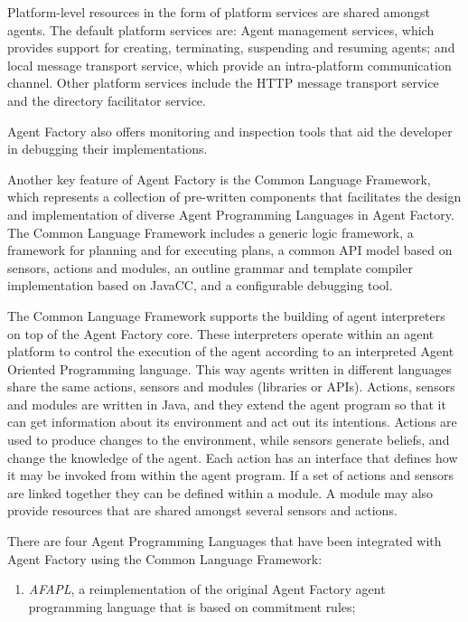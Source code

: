 \documentclass[a4paper,12pt,oneside,fleqn]{book} %
\begin{document}
{Platform-level resources in the form of platform services are shared
amongst agents. The default platform services are: Agent management
services, which provides support for creating, terminating, suspending and
resuming agents; and local message transport service, which provide an
intra-platform communication channel. Other platform services include the
HTTP message transport service and the directory facilitator service.

Agent Factory also offers monitoring and inspection tools that aid the
developer in debugging their implementations.

Another key feature of Agent Factory is the Common Language Framework,
which represents a collection of pre-written components that facilitates
the design and implementation of diverse Agent Programming Languages in
Agent Factory\null. The Common Language Framework includes a generic logic
framework, a framework for planning and for executing plans, a common API
model based on sensors, actions and modules, an outline grammar and
template compiler implementation based on JavaCC, and a configurable
debugging tool.

The Common Language Framework supports the building of agent interpreters
on top of the Agent Factory core. These interpreters operate within an
agent platform to control the execution of the agent according to an
interpreted Agent Oriented Programming language. This way agents written in
different languages share the same actions, sensors and modules (libraries
or APIs). Actions, sensors and modules are written in Java, and they extend
the agent program so that it can get information about its environment and
act out its intentions. Actions are used to produce changes to the
environment, while sensors generate beliefs, and change the knowledge of
the agent. Each action has an interface that defines how it may be invoked
from within the agent program. If a set of actions and sensors are linked
together they can be defined within a module. A module may also provide
resources that are shared amongst several sensors and actions.

There are four Agent Programming Languages that have been integrated with
Agent Factory using the Common Language Framework: \begin{enumerate}

\item \textit{AFAPL}, a reimplementation of the original Agent Factory
agent programming language that is based on commitment rules;


\end{enumerate}}
\end{document}
